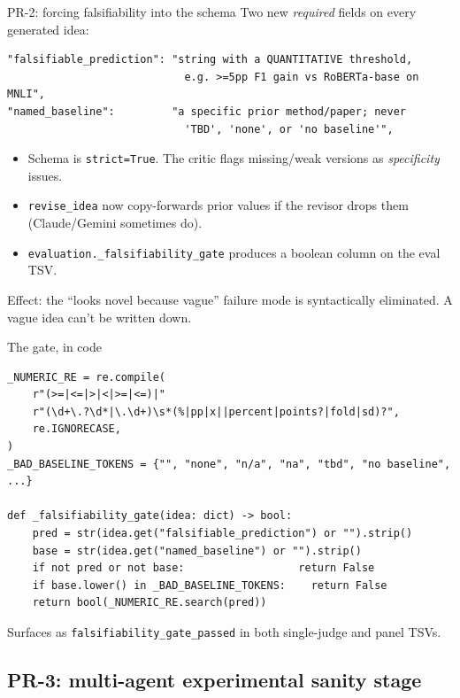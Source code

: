 \documentclass[10pt,aspectratio=169]{beamer}
\begin{document}
\begin{frame}[fragile]{PR-2: forcing falsifiability into the schema}
  Two new \emph{required} fields on every generated idea:
  \begin{lstlisting}
"falsifiable_prediction": "string with a QUANTITATIVE threshold,
                            e.g. >=5pp F1 gain vs RoBERTa-base on MNLI",
"named_baseline":         "a specific prior method/paper; never
                            'TBD', 'none', or 'no baseline'",
  \end{lstlisting}

  \begin{itemize}
    \item Schema is \texttt{strict=True}. The critic flags missing/weak versions
      as \emph{specificity} issues.
    \item \texttt{revise\_idea} now copy-forwards prior values if the revisor
      drops them (Claude/Gemini sometimes do).
    \item \texttt{evaluation.\_falsifiability\_gate} produces a boolean column
      on the eval TSV.
  \end{itemize}
  \vspace{0.3em}
  \alert{Effect:} the ``looks novel because vague'' failure mode is
  syntactically eliminated. A vague idea can't be written down.
\end{frame}

\begin{frame}[fragile]{The gate, in code}
  \begin{lstlisting}
_NUMERIC_RE = re.compile(
    r"(>=|<=|>|<|>=|<=)|"
    r"(\d+\.?\d*|\.\d+)\s*(%|pp|x||percent|points?|fold|sd)?",
    re.IGNORECASE,
)
_BAD_BASELINE_TOKENS = {"", "none", "n/a", "na", "tbd", "no baseline", ...}

def _falsifiability_gate(idea: dict) -> bool:
    pred = str(idea.get("falsifiable_prediction") or "").strip()
    base = str(idea.get("named_baseline") or "").strip()
    if not pred or not base:                  return False
    if base.lower() in _BAD_BASELINE_TOKENS:    return False
    return bool(_NUMERIC_RE.search(pred))
  \end{lstlisting}

  \scriptsize Surfaces as \texttt{falsifiability\_gate\_passed} in both single-judge and panel TSVs.
\end{frame}


\subsection{PR-3: multi-agent experimental sanity stage}
\end{document}
